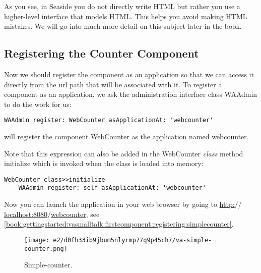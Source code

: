 \documentclass[a4paper,10pt,twoside]{book}
\newcommand{\ct}[1]{{\small\ttfamily\textup{#1}}}
\begin{document}
As you see, in Seaside you do not directly write HTML but rather you use a higher-level interface that models HTML.  This helps you avoid making HTML mistakes.  We will go into much more detail on this subject later in the book.

\subsection{Registering the Counter Component}
\label{book:gettingstarted:vasmalltalk:firstcomponent:registering}

Now we should register the component as an application so that we can access it directly from the url path that will be associated with it. To register a component as an application, we ask the administration interface class \ct{WAAdmin} to do the work for us:

\begin{lstlisting}
WAAdmin register: WebCounter asApplicationAt: 'webcounter'
\end{lstlisting}

will register the component \ct{WebCounter} as the application named \ct{webcounter}.

Note that this expression can also be added in the \ct{WebCounter} \textit{class} method \ct{initialize} which is invoked when the class is loaded into memory:

\begin{lstlisting}
WebCounter class>>initialize
    WAAdmin register: self asApplicationAt: 'webcounter'
\end{lstlisting}

Now you can launch the application in your web browser by going to \href{http://localhost:8080/webcounter}{http:$/$$/$localhost:8080$/$webcounter}, see \autoref{book:gettingstarted:vasmalltalk:firstcomponent:registering:simplecounter}.

\begin{figure}[h!tbp]
	\begin{center}
		\texttt{[image: e2/d0fh33ib9jbum5nlyrmp77q9p45ch7/va-simple-counter.png]}
		\caption{Simple-counter.\label{book:gettingstarted:vasmalltalk:firstcomponent:registering:simplecounter}}
	\end{center}
\end{figure}


\end{document}
